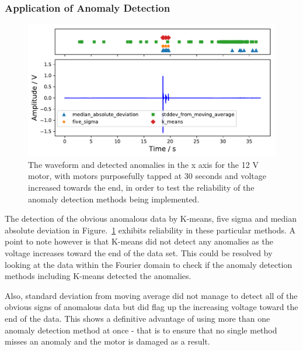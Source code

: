 \subsubsection{Application of Anomaly Detection}

\begin{figure}[t]
    \includegraphics[width=1.0\textwidth]{fig/specific_anomaly_test1_motornorm12V.pdf}
    \caption[Specific Anomaly Test]{The waveform and detected anomalies in the x axis for the 12 V motor, with motors purposefully tapped at 30 seconds and voltage increased towards the end, in order to test the reliability of the anomaly detection methods being implemented.}
    \label{fig:spec_anom1}
\end{figure}

The detection of the obvious anomalous data by K-means, five sigma and median absolute deviation in Figure.~\ref{fig:spec_anom1} exhibits reliability in these particular methods. A point to note however is that K-means did not detect any anomalies as the voltage increases toward the end of the data set. This could be resolved by looking at the data within the Fourier domain to check if the anomaly detection methods including K-means detected the anomalies. 

Also, standard deviation from moving average did not manage to detect all of the obvious signs of anomalous data but did flag up the increasing voltage toward the end of the data. This shows a definitive advantage of using more than one anomaly detection method at once - that is to ensure that no single method misses an anomaly and the motor is damaged as a result.


